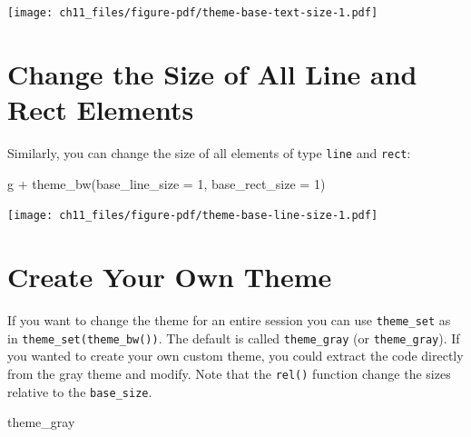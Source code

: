 \documentclass[
  letterpaper,
]{scrbook}
\newenvironment{Shaded}{\begin{snugshade}}{\end{snugshade}}
\newcommand{\AttributeTok}[1]{\textcolor[rgb]{0.40,0.45,0.13}{#1}}
\newcommand{\DecValTok}[1]{\textcolor[rgb]{0.68,0.00,0.00}{#1}}
\newcommand{\FunctionTok}[1]{\textcolor[rgb]{0.28,0.35,0.67}{#1}}
\newcommand{\NormalTok}[1]{\textcolor[rgb]{0.00,0.23,0.31}{#1}}
\newcommand{\SpecialCharTok}[1]{\textcolor[rgb]{0.37,0.37,0.37}{#1}}
\begin{document}
\texttt{[image: ch11\_files/figure-pdf/theme-base-text-size-1.pdf]}

\section{Change the Size of All Line and Rect
Elements}\label{change-the-size-of-all-line-and-rect-elements}

Similarly, you can change the size of all elements of type \texttt{line}
and \texttt{rect}:

\begin{Shaded}
\begin{Highlighting}[]
\NormalTok{g }\SpecialCharTok{+} \FunctionTok{theme\_bw}\NormalTok{(}\AttributeTok{base\_line\_size =} \DecValTok{1}\NormalTok{, }\AttributeTok{base\_rect\_size =} \DecValTok{1}\NormalTok{)}
\end{Highlighting}
\end{Shaded}

\texttt{[image: ch11\_files/figure-pdf/theme-base-line-size-1.pdf]}

\section{Create Your Own Theme}\label{create-your-own-theme}

If you want to change the theme for an entire session you can use
\texttt{theme\_set} as in \texttt{theme\_set(theme\_bw())}. The default
is called \texttt{theme\_gray} (or \texttt{theme\_gray}). If you wanted
to create your own custom theme, you could extract the code directly
from the gray theme and modify. Note that the \texttt{rel()} function
change the sizes relative to the \texttt{base\_size}.

\begin{Shaded}
\begin{Highlighting}[]
\NormalTok{theme\_gray}
\end{Highlighting}
\end{Shaded}
\end{document}

